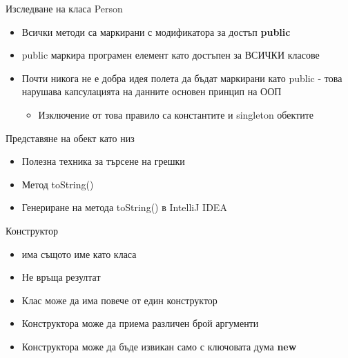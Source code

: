\documentclass{beamer}
\begin{document}
\begin{frame}{Изследване на класа Person}
  \transdissolve
  \begin{itemize}
  \item Всички методи са маркирани с
    модификатора за достъп \textbf{public} \pause
  \item public маркира програмен елемент като
    достъпен за ВСИЧКИ класове \pause
  \item Почти никога не е добра идея полета да
    бъдат маркирани като public - това
    нарушава капсулацията на данните
    основен принцип на ООП
    \begin{itemize}
      \item Изключение от това правило са константите и singleton обектите
    \end{itemize}
  \end{itemize}
\end{frame}

\begin{frame}{Представяне на обект като низ}
  \transdissolve
  \begin{itemize}
  \item Полезна техника за търсене на грешки \pause
  \item Метод toString() \pause
  \item Генериране на метода toString() в IntelliJ IDEA
  \end{itemize}
\end{frame}

\begin{frame}{Конструктор}
  \transdissolve
  \begin{itemize}
  \item има същото име като класа \pause
  \item Не връща резултат \pause
  \item Клас може да има повече от един
    конструктор \pause
  \item Конструктора може да приема различен
    брой аргументи \pause
  \item Конструктора може да бъде извикан
    само с ключовата дума \textbf{new}
  \end{itemize}
\end{frame}
\end{document}
